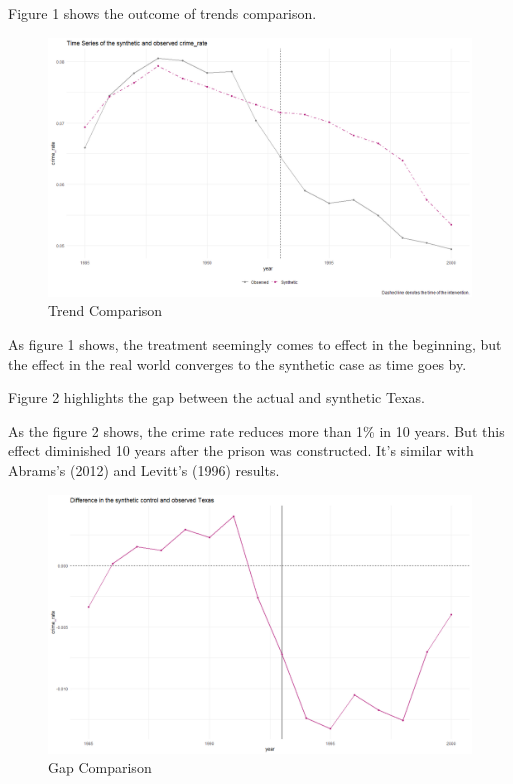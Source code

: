 \documentclass{article}
\begin{document}
Figure 1 shows the outcome of trends comparison. 

\begin{figure}[H]
    \begin{center}
        \includegraphics[width=.85\textwidth]{Figures/figure_1.png}
    \end{center}
    \caption{Trend Comparison}
    \label{fig:graph}
\end{figure}

As figure 1 shows, the treatment seemingly comes to effect in the beginning, but the effect in the real world converges to the synthetic case as time goes by. 

Figure 2 highlights the gap between the actual and synthetic Texas.

As the figure 2 shows, the crime rate reduces more than 1\% in 10 years. But this effect diminished 10 years after the prison was constructed. It's similar with Abrams's (2012) and Levitt's (1996) results.


\begin{figure}[H]
    \begin{center}
        \includegraphics[width=.85\textwidth]{Figures/figure_2.png}
    \end{center}
    \caption{Gap Comparison}
    \label{fig:graph}
\end{figure}
\end{document}
